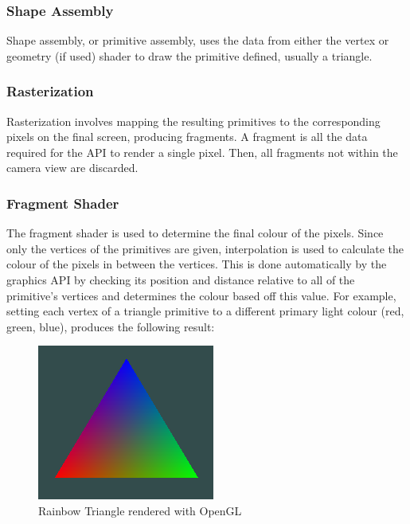 \documentclass[12pt]{article}
\begin{document}
    \subsubsection{Shape Assembly}

    Shape assembly, or primitive assembly, uses the data from either the vertex or geometry (if used) shader to draw the primitive defined, usually a triangle.

    \subsubsection{Rasterization}

    Rasterization involves mapping the resulting primitives to the corresponding pixels on the final screen, producing fragments. A fragment is all the data required for the API to render a single pixel. Then, all fragments not within the camera view are discarded.

    \subsubsection{Fragment Shader}

    The fragment shader is used to determine the final colour of the pixels. Since only the vertices of the primitives are given, interpolation is used to calculate the colour of the pixels in between the vertices. This is done automatically by the graphics API by checking its position and distance relative to all of the primitive's vertices and determines the colour based off this value. For example, setting each vertex of a triangle primitive to a different primary light colour (red, green, blue), produces the following result:

    \begin{figure}[H]
        \begin{center}
            \noindent\includegraphics{rainbowTriangle.png}
            \caption{Rainbow Triangle rendered with OpenGL}
        \end{center}
    \end{figure}
\end{document}
